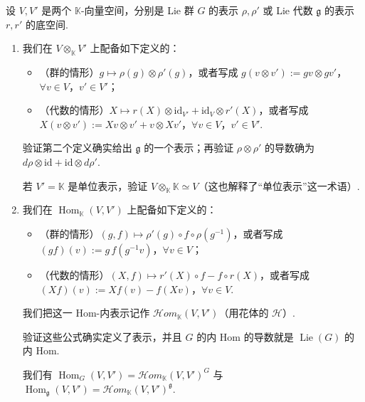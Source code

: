 \begin{numpara}\label{np:lie-1-12-5}
设 $V,V'$ 是两个 $\mathbb K$-向量空间，分别是 Lie 群 $G$ 的表示 $\rho,\rho'$ 或 Lie 代数 $\mathfrak g$ 的表示 $r,r'$ 的底空间.
\begin{enumerate}[label=\roman*)]
\item 我们在 $V\otimes_{\mathbb K}V'$ 上配备如下定义的：
\begin{itemize}[label=--]
\item （群的情形）$g\mapsto\rho(g)\otimes\rho'(g)$，或者写成 $g(v\otimes v'):=gv\otimes gv'$，$\forall v\in V$，$v'\in V'$；
\item （代数的情形）$X\mapsto r(X)\otimes\mathrm{id}_{V'}+\mathrm{id}_{V}\otimes r'(X)$，或者写成 $X(v\otimes v'):=Xv\otimes v'+v\otimes Xv'$，$\forall v\in V$，$v'\in V'$.
\end{itemize}
\begin{exercise*}
验证第二个定义确实给出 $\mathfrak g$ 的一个表示；再验证 $\rho\otimes\rho'$ 的导数确为 $d\rho\otimes\mathrm{id}+\mathrm{id}\otimes d\rho'$.
\end{exercise*}
\begin{exercise*}
若 $V'=\mathbb K$ 是单位表示，验证 $V\otimes_{\mathbb K}\mathbb K\simeq V$（这也解释了``单位表示''这一术语）.
\end{exercise*}
\item 我们在 $\operatorname{Hom}_{\mathbb K}(V,V')$ 上配备如下定义的：
\begin{itemize}[label=--]
\item （群的情形）$(g,f)\mapsto\rho'(g)\circ f\circ\rho(g^{-1})$，或者写成 $(gf)(v):=g\,f(g^{-1}v)$，$\forall v\in V$；
\item （代数的情形）$(X,f)\mapsto r'(X)\circ f-f\circ r(X)$，或者写成 $(Xf)(v):=Xf(v)-f(Xv)$，$\forall v\in V$.
\end{itemize}
我们把这一 Hom-内表示记作 $\mathcal{H}om_{\mathbb K}(V,V')$（用花体的 $\mathcal H$）.
\begin{exercise*}
验证这些公式确实定义了表示，并且 $G$ 的内 Hom 的导数就是 $\operatorname{Lie}(G)$ 的内 Hom.
\end{exercise*}
\begin{remark*}
我们有 $\operatorname{Hom}_{G}(V,V')=\mathcal{H}om_{\mathbb K}(V,V')^{G}$ 与 $\operatorname{Hom}_{\mathfrak g}(V,V')=\mathcal{H}om_{\mathbb K}(V,V')^{\mathfrak g}$.
\end{remark*}

\end{enumerate}
\end{numpara}
